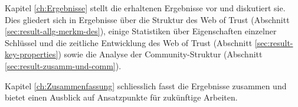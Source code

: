 Kapitel \ref{ch:Ergebnisse} stellt die erhaltenen Ergebnisse vor und
diskutiert sie. Dies gliedert sich in Ergebnisse \"uber die Struktur
des Web of Trust (Abschnitt \ref{sec:result-allg-merkm-des}), einige
Statistiken \"uber Eigenschaften einzelner Schl\"ussel und die
zeitliche Entwicklung des Web of Trust (Abschnitt
\ref{sec:result-key-properties}) sowie die Analyse der
Community-Struktur (Abschnitt \ref{sec:result-zusamm-und-comm}).

Kapitel \ref{ch:Zusammenfassung} schliesslich fasst die Ergebnisse
zusammen und bietet einen Ausblick auf Ansatzpunkte f\"ur zuk\"unftige
Arbeiten.

